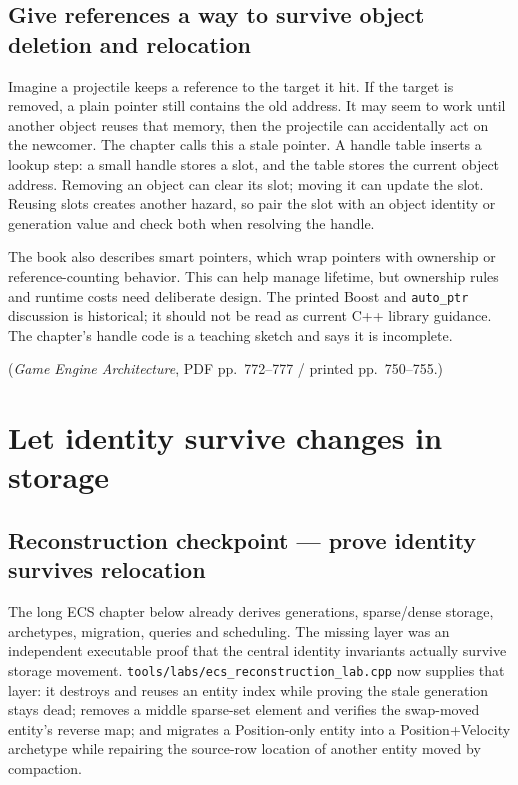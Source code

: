 \subsection{Give references a way to survive object deletion and relocation}\label{05-engine-i-ch014-give-references-a-way-to-survive-object-deletion-and-relocation}

Imagine a projectile keeps a reference to the target it hit. If the target is removed, a plain pointer still contains the old address. It may seem to work until another object reuses that memory, then the projectile can accidentally act on the newcomer. The chapter calls this a stale pointer. A handle table inserts a lookup step: a small handle stores a slot, and the table stores the current object address. Removing an object can clear its slot; moving it can update the slot. Reusing slots creates another hazard, so pair the slot with an object identity or generation value and check both when resolving the handle.

The book also describes smart pointers, which wrap pointers with ownership or reference-counting behavior. This can help manage lifetime, but ownership rules and runtime costs need deliberate design. The printed Boost and \texttt{auto\_ptr} discussion is historical; it should not be read as current C++ library guidance. The chapter's handle code is a teaching sketch and says it is incomplete.

(\emph{Game Engine Architecture}, PDF pp.~772--777 / printed pp.~750--755.)

\section{Let identity survive changes in storage}\label{05-engine-i-ch014-let-identity-survive-changes-in-storage}

\subsection{Reconstruction checkpoint --- prove identity survives relocation}\label{05-engine-i-ch014-reconstruction-checkpoint-prove-identity-survives-relocation}

The long ECS chapter below already derives generations, sparse/dense storage, archetypes, migration, queries and scheduling. The missing layer was an independent executable proof that the central identity invariants actually survive storage movement. \texttt{tools/labs/ecs\_reconstruction\_lab.cpp} now supplies that layer: it destroys and reuses an entity index while proving the stale generation stays dead; removes a middle sparse-set element and verifies the swap-moved entity's reverse map; and migrates a Position-only entity into a Position+Velocity archetype while repairing the source-row location of another entity moved by compaction.


